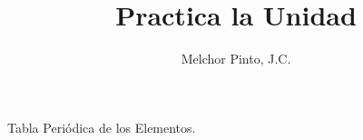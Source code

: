 \documentclass[12pt,addpoints]{repaso}
\title{Practica la Unidad}
\author{Melchor Pinto, J.C.}
\begin{document}
\INFO%
\ejemplosboxed[]
\begin{questions}
    \questionboxed[5]{}
    \questionboxed[5]{}

    \begin{multicols}{2}
    \ejemplosboxed[]
    \ejemplosboxed[]
    \end{multicols}
    
    \begin{multicols}{2}
        \questionboxed[5]{}
        \questionboxed[5]{}
    \end{multicols}

    \begin{multicols}{2}
    \questionboxed[5]{}
    \questionboxed[5]{}
    \end{multicols}

    \begin{multicols}{2}
    \questionboxed[5]{}
    \questionboxed[5]{}
    \end{multicols}

    \questionboxed[5]{}
    \questionboxed[10]{}

    \questionboxed[5]{}
    \questionboxed[5]{}
    \questionboxed[5]{}
    \questionboxed[5]{}

    
    \begin{multicols}{2}
    \questionboxed[15]{}
    \questionboxed[5]{}
    \end{multicols}

    \questionboxed[5]{}


\end{questions}
\begin{landscape}
    \begin{minipage}[b]{\textwidth}
        \thispagestyle{foot}
        \begin{table}[H]
            \centering
            \caption{Tabla Peri\'odica de los Elementos.}
            \TablaPeriodica[0.48]
            \label{tab:periodic_table}
        \end{table}
    \end{minipage}
\end{landscape}
\end{document}
